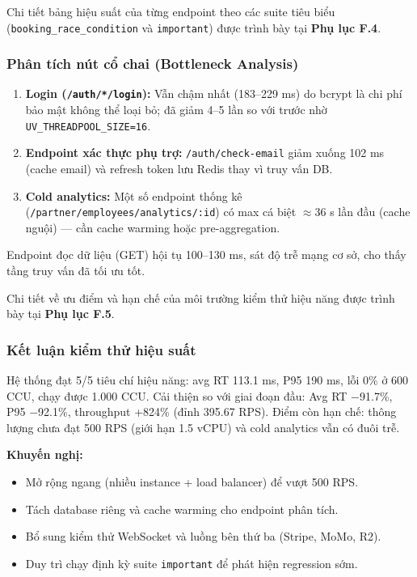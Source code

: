 Chi tiết bảng hiệu suất của từng endpoint theo các suite tiêu biểu (\texttt{booking\_race\_condition} và \texttt{important}) được trình bày tại \textbf{Phụ lục F.4}.

\subsubsection{Phân tích nút cổ chai (Bottleneck Analysis)}

\begin{enumerate}
    \item \textbf{Login (\texttt{/auth/*/login}):} Vẫn chậm nhất (183--229 ms) do bcrypt là chi phí bảo mật không thể loại bỏ; đã giảm 4--5 lần so với trước nhờ \texttt{UV\_THREADPOOL\_SIZE=16}.
    \item \textbf{Endpoint xác thực phụ trợ:} \texttt{/auth/check-email} giảm xuống 102 ms (cache email) và refresh token lưu Redis thay vì truy vấn DB.
    \item \textbf{Cold analytics:} Một số endpoint thống kê (\texttt{/partner/employees/analytics/:id}) có max cá biệt $\approx$36 s lần đầu (cache nguội) --- cần cache warming hoặc pre-aggregation.
\end{enumerate}

Endpoint đọc dữ liệu (GET) hội tụ 100--130 ms, sát độ trễ mạng cơ sở, cho thấy tầng truy vấn đã tối ưu tốt.


Chi tiết về ưu điểm và hạn chế của môi trường kiểm thử hiệu năng được trình bày tại \textbf{Phụ lục F.5}.

\subsubsection{Kết luận kiểm thử hiệu suất}

Hệ thống đạt 5/5 tiêu chí hiệu năng: avg RT 113.1 ms, P95 190 ms, lỗi 0\% ở 600 CCU, chạy được 1.000 CCU. Cải thiện so với giai đoạn đầu: Avg RT $-$91.7\%, P95 $-$92.1\%, throughput +824\% (đỉnh 395.67 RPS). Điểm còn hạn chế: thông lượng chưa đạt 500 RPS (giới hạn 1.5 vCPU) và cold analytics vẫn có đuôi trễ.

\noindent\textbf{Khuyến nghị:}
\begin{itemize}
    \item Mở rộng ngang (nhiều instance + load balancer) để vượt 500 RPS.
    \item Tách database riêng và cache warming cho endpoint phân tích.
    \item Bổ sung kiểm thử WebSocket và luồng bên thứ ba (Stripe, MoMo, R2).
    \item Duy trì chạy định kỳ suite \texttt{important} để phát hiện regression sớm.
\end{itemize}

